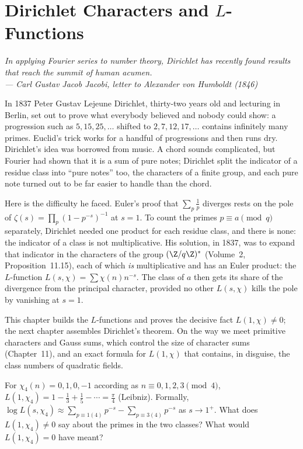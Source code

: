 \chapter{Dirichlet Characters and \texorpdfstring{$L$}{L}-Functions}

\begin{center}\itshape
In applying Fourier series to number theory, Dirichlet has recently found results that reach the summit of human acumen.\\
\upshape --- Carl Gustav Jacob Jacobi, letter to Alexander von Humboldt (1846)
\end{center}

In 1837 Peter Gustav Lejeune Dirichlet, thirty-two years old and lecturing in Berlin, set out to prove what everybody believed and nobody could
show: a progression such as $5,15,25,\dots$ shifted to $2,7,12,17,\dots$ contains infinitely many primes. Euclid's trick works for a handful of
progressions and then runs dry. Dirichlet's idea was borrowed from music. A chord sounds complicated, but Fourier had shown that it is a sum of pure
notes; Dirichlet split the indicator of a residue class into ``pure notes'' too, the characters of a finite group, and each pure note turned out
to be far easier to handle than the chord.

Here is the difficulty he faced. Euler's proof that $\sum_p\frac1p$ diverges rests on the pole of $\zeta(s)=\prod_p(1-p^{-s})^{-1}$ at $s=1$. To count the primes $p\equiv a\pmod q$
separately, Dirichlet needed one product for each residue class, and there is none: the indicator of a class is not
multiplicative. His solution, in 1837, was to expand that indicator in the characters of the group $(\Z/q\Z)^*$ (Volume~2,
Proposition~11.15), each of which \emph{is} multiplicative and has an Euler product: the $L$-function $L(s,\chi)=\sum\chi(n)n^{-s}$.
The class of $a$ then gets its share of the divergence from the principal character, provided no other $L(s,\chi)$ kills the
pole by vanishing at $s=1$.

This chapter builds the $L$-functions and proves the decisive fact $L(1,\chi)\ne0$; the next chapter assembles Dirichlet's theorem. On
the way we meet primitive characters and Gauss sums, which control the size of character sums (Chapter~11), and an exact
formula for $L(1,\chi)$ that contains, in disguise, the class numbers of quadratic fields.

\begin{think}
For $\chi_4(n)=0,1,0,-1$ according as $n\equiv0,1,2,3\pmod4$, $L(1,\chi_4)=1-\frac13+\frac15-\cdots=\frac\pi4$ (Leibniz). Formally,
$\log L(s,\chi_4)\approx\sum_{p\equiv1(4)}p^{-s}-\sum_{p\equiv3(4)}p^{-s}$ as $s\to1^+$. What does $L(1,\chi_4)\ne0$ say about the primes in the two classes?
What would $L(1,\chi_4)=0$ have meant?
\end{think}

